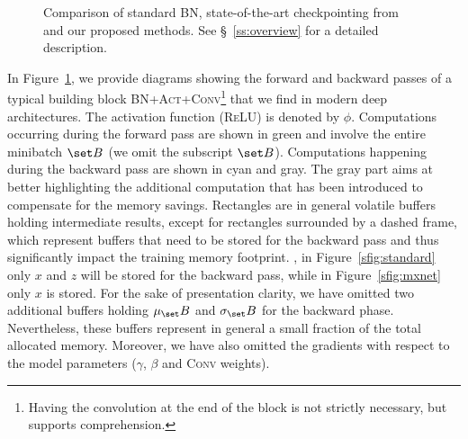 \documentclass[10pt,twocolumn,letterpaper]{article}
\begin{document}
\begin{figure}[h]
	\caption{Comparison of standard \textsc{BN}, state-of-the-art checkpointing from~\cite{Martens2012,Chen+16} and our proposed methods. See \S~\ref{ss:overview} for a detailed description.}
	\label{fig:overview}
	\vspace{-15pt}
\end{figure}

In Figure~\ref{fig:overview}, we provide diagrams showing the forward and backward passes of a typical building block \textsc{BN+Act+Conv}\footnote{Having the convolution at the end of the block is not strictly necessary, but supports comprehension.} that we find in modern deep architectures. %
The activation function (\eg \textsc{ReLU}) is denoted by $\phi$.
Computations occurring during the forward pass are shown in green and involve the entire minibatch $\set B$ (we omit the subscript $\set B$). Computations happening during the backward pass are shown in cyan and gray. The gray part aims at better highlighting the additional computation that has been introduced to compensate for the memory savings.
Rectangles are in general volatile buffers holding intermediate results, except for rectangles surrounded by a dashed frame, which represent buffers that need to be stored for the backward pass and thus significantly impact the training memory footprint. \Eg, in Figure~\ref{sfig:standard} only $x$ and $z$ will be stored for the backward pass, while in Figure~\ref{sfig:mxnet} only $x$ is stored. 
For the sake of presentation clarity, we have omitted two additional buffers holding $\mu_\set B$ and $\sigma_\set B$ for the  backward phase. Nevertheless, these buffers represent in general a small fraction of the total allocated memory. Moreover, we have also omitted the gradients with respect to the model parameters (\ie $\gamma$, $\beta$ and \textsc{Conv} weights).
\end{document}
